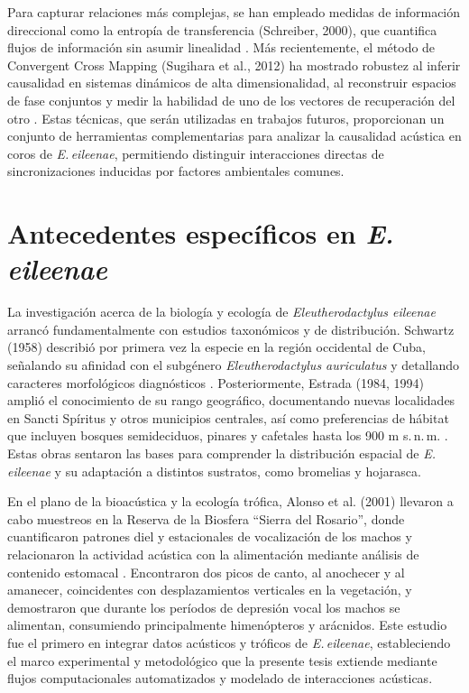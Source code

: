 Para capturar relaciones más complejas, se han empleado medidas de 
información direccional como la entropía de transferencia 
(Schreiber, 2000), que cuantifica flujos de información sin 
asumir linealidad \cite{schreiber2000measuring}. Más recientemente, el 
método de Convergent Cross Mapping (Sugihara et al., 2012) ha 
mostrado robustez al inferir causalidad en sistemas dinámicos de 
alta dimensionalidad, al reconstruir espacios de fase conjuntos 
y medir la habilidad de uno de los vectores de recuperación del 
otro \cite{sugihara2012detecting}. Estas técnicas, que serán
utilizadas en trabajos futuros, proporcionan un 
conjunto de herramientas complementarias para analizar la 
causalidad acústica en coros de \emph{E.\,eileenae}, permitiendo 
distinguir interacciones directas de sincronizaciones inducidas 
por factores ambientales comunes.

\section{Antecedentes específicos en \emph{E.\,eileenae}}
\label{sec:antecedentes_eileenae}

La investigación acerca de la biología y ecología de 
\emph{Eleutherodactylus eileenae} arrancó fundamentalmente con 
estudios taxonómicos y de distribución. Schwartz (1958) 
describió por primera vez la especie en la región occidental de 
Cuba, señalando su afinidad con el subgénero 
\emph{Eleutherodactylus auriculatus} y detallando caracteres 
morfológicos diagnósticos \cite{schwartz1958new}. Posteriormente, 
Estrada (1984, 1994) amplió el conocimiento de su rango 
geográfico, documentando nuevas localidades en Sancti Spíritus 
y otros municipios centrales, así como preferencias de hábitat 
que incluyen bosques semideciduos, pinares y cafetales hasta 
los 900 m s.\,n.\,m. \cite{estrada1984nuevas,estrada1994herpetofauna}. 
Estas obras sentaron las bases para comprender la distribución 
espacial de \emph{E.\,eileenae} y su adaptación a distintos 
sustratos, como bromelias y hojarasca.

En el plano de la bioacústica y la ecología trófica, Alonso et 
al. (2001) llevaron a cabo muestreos en la Reserva de la 
Biosfera “Sierra del Rosario”, donde cuantificaron patrones 
diel y estacionales de vocalización de los machos y 
relacionaron la actividad acústica con la alimentación mediante 
análisis de contenido estomacal \cite{alonso2001patrones}. Encontraron 
dos picos de canto, al anochecer y al amanecer, coincidentes 
con desplazamientos verticales en la vegetación, y demostraron 
que durante los períodos de depresión vocal los machos se 
alimentan, consumiendo principalmente himenópteros y arácnidos. 
Este estudio fue el primero en integrar datos acústicos y 
tróficos de \emph{E.\,eileenae}, estableciendo el marco 
experimental y metodológico que la presente tesis extiende 
mediante flujos computacionales automatizados y modelado de 
interacciones acústicas.
















